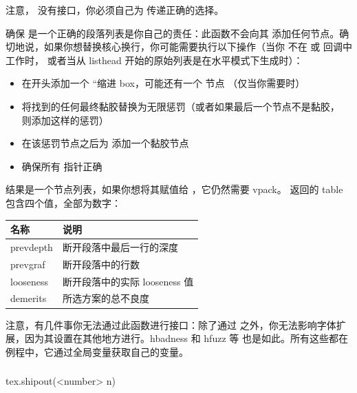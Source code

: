 注意， 没有接口，你必须自己为 
传递正确的选择。

确保  是一个正确的段落列表是你自己的责任：此函数不会向其
添加任何节点。确切地说，如果你想替换核心换行，你可能需要执行以下操作（当你
不在  或  回调中工作时，
或者当从 listhead 开始的原始列表是在水平模式下生成时）：

\begin{itemize}\item 在开头添加一个 ``缩进 box，可能还有一个  节点
    （仅当你需要时）

\item 将找到的任何最终黏胶替换为无限惩罚（或者如果最后一个节点不是黏胶，
    则添加这样的惩罚）

\item 在该惩罚节点之后为  添加一个黏胶节点

\item 确保所有  指针正确

\end{itemize}

结果是一个节点列表，如果你想将其赋值给 ，它仍然需要 vpack。
返回的  table 包含四个值，全部为数字：

\begin{longtable}{l p{5cm}}
\toprule 名称      & 说明 \\
\midrule
prevdepth & 断开段落中最后一行的深度 \\
prevgraf  & 断开段落中的行数 \\
looseness & 断开段落中的实际 looseness 值 \\
demerits  & 所选方案的总不良度  \\
\bottomrule
\end{longtable}

注意，有几件事你无法通过此函数进行接口：除了通过 
之外，你无法影响字体扩展，因为其设置在其他地方进行。hbadness 和 hfuzz 等
也是如此。所有这些都在  例程中，它通过全局变量获取自己的变量。

\subsubsection{}



\begin{typing}
tex.shipout(<number> n)
\end{typing}

